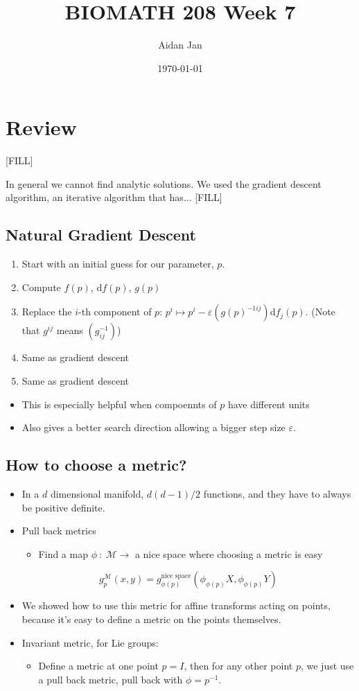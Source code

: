 \documentclass[10pt]{article}
\title{BIOMATH 208 Week 7}
\author{Aidan Jan}
\date{\today}
\newcommand{\dd}{\text{d}}
\begin{document}
\maketitle
\section*{Review}
[FILL]

In general we cannot find analytic solutions.  We used the gradient descent algorithm, an iterative algorithm that has... [FILL]

\subsection*{Natural Gradient Descent}
\begin{enumerate}
    \item Start with an initial guess for our parameter, $p$.
    \item Compute $f(p)$, $\dd f(p)$, $g(p)$
    \item Replace the $i$-th component of $p$:  $p^i \mapsto p^i - \varepsilon(g(p)^{-1ij}) \dd f_j(p)$.  (Note that $g^{ij}$ means $(g^{-1}_{ij})$)
    \item Same as gradient descent
    \item Same as gradient descent
\end{enumerate}
\begin{itemize}
	\item This is especially helpful when compoennts of $p$ have different units
    \item Also gives a better search direction allowing a bigger step size $\varepsilon$.
\end{itemize}

\subsection*{How to choose a metric?}
\begin{itemize}
	\item In a $d$ dimensional manifold, $d(d - 1)/2$ functions, and they have to always be positive definite.
	\item Pull back metrics
	\begin{itemize}
        \item Find a map $\phi \::\: \mathcal{M} \rightarrow$ a nice space where choosing a metric is easy
    \end{itemize}
    \[g_p^{\mathcal{M}}(x, y) = g_{\phi(p)}^{\text{nice space}} (\phi_{\phi(p)}X, \phi_{\phi(p)}Y)\]
    \item We showed how to use this metric for affine transforms acting on points, because it's easy to define a metric on the points themselves.
    \item Invariant metric, for Lie groups:
    \begin{itemize}
        \item Define a metric at one point $p = I$, then for any other point $p$, we just use a pull back metric, pull back with $\phi = p^{-1}$.
    \end{itemize}
\end{itemize}
\end{document}
